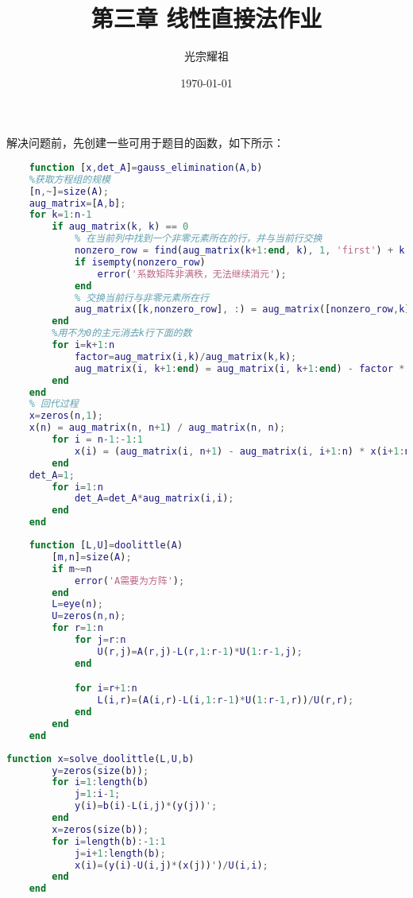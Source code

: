 \documentclass{ctexart}
\title{{\kaishu 第三章 线性直接法作业}}
\author{{\kaishu 光宗耀祖}}
\date{\today}
\begin{document}
\maketitle

解决问题前，先创建一些可用于题目的函数，如下所示：
\begin{lstlisting}[caption=Guass消去法解方程组函数, language=matlab]
    %高斯消去法求解线性方程组Ax=b
    function [x,det_A]=gauss_elimination(A,b)
    %获取方程组的规模
    [n,~]=size(A);
    aug_matrix=[A,b];
    for k=1:n-1
        if aug_matrix(k, k) == 0
            % 在当前列中找到一个非零元素所在的行，并与当前行交换
            nonzero_row = find(aug_matrix(k+1:end, k), 1, 'first') + k;
            if isempty(nonzero_row)
                error('系数矩阵非满秩，无法继续消元');
            end
            % 交换当前行与非零元素所在行
            aug_matrix([k,nonzero_row], :) = aug_matrix([nonzero_row,k], :);
        end
        %用不为0的主元消去k行下面的数
        for i=k+1:n
            factor=aug_matrix(i,k)/aug_matrix(k,k);
            aug_matrix(i, k+1:end) = aug_matrix(i, k+1:end) - factor * aug_matrix(k, k+1:end);
        end
    end
    % 回代过程
    x=zeros(n,1);
    x(n) = aug_matrix(n, n+1) / aug_matrix(n, n);
        for i = n-1:-1:1
            x(i) = (aug_matrix(i, n+1) - aug_matrix(i, i+1:n) * x(i+1:n)) / aug_matrix(i, i);
        end
    det_A=1;
        for i=1:n
            det_A=det_A*aug_matrix(i,i);
        end
    end
\end{lstlisting}
\begin{lstlisting}[caption=Doolittle分解函数, language=matlab]
    %对矩阵A进行doolittle分解
    function [L,U]=doolittle(A)
        [m,n]=size(A);
        if m~=n
            error('A需要为方阵');
        end
        L=eye(n);
        U=zeros(n,n);
        for r=1:n
            for j=r:n
                U(r,j)=A(r,j)-L(r,1:r-1)*U(1:r-1,j);
            end

            for i=r+1:n
                L(i,r)=(A(i,r)-L(i,1:r-1)*U(1:r-1,r))/U(r,r);
            end
        end
    end    
\end{lstlisting}
\begin{lstlisting}[caption=Doolittle分解法求解方程组函数, language=matlab]
    function x=solve_doolittle(L,U,b)
        y=zeros(size(b));
        for i=1:length(b)
            j=1:i-1;
            y(i)=b(i)-L(i,j)*(y(j))';
        end
        x=zeros(size(b));
        for i=length(b):-1:1
            j=i+1:length(b);
            x(i)=(y(i)-U(i,j)*(x(j))')/U(i,i);
        end
    end
\end{lstlisting}
\end{document}
